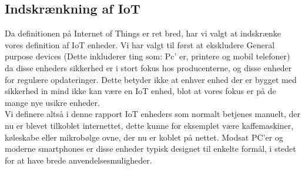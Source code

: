         \subsection{Indskrænkning af IoT}
        Da definitionen på Internet of Things er ret bred, har vi valgt at indskrænke vores definition af IoT enheder. Vi har valgt til først at ekskludere General purpose devices (Dette inkluderer ting som: Pc' er, printere og mobil telefoner) da disse enheders sikkerhed er i stort fokus hos producenterne, og disse enheder for regulære opdateringer. Dette betyder ikke at enhver enhed der er bygget med sikkerhed
        in mind %
        ikke kan være en IoT enhed, blot at vores fokus er på de mange nye usikre enheder.\\
        Vi definere altså i denne rapport IoT enheders som normalt betjenes manuelt, der nu er blevet tilkoblet internettet, dette kunne for eksemplet være kaffemaskiner, køleskabe eller mikrobølge ovne, der nu er koblet på nettet. Modsat PC'er og moderne smartphones er disse enheder typisk designet til enkelte formål, i stedet for at have brede anvendelsesmuligheder.

\newpage


